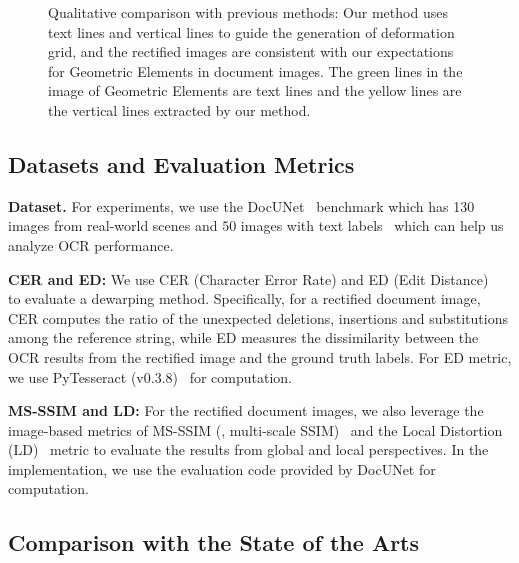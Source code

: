 \documentclass[10pt,twocolumn,letterpaper]{article}
\newcommand{\myparagraph}[1]{\vspace{1pt} \noindent \textbf{#1} }
\begin{document}
\begin{figure*}[!t]
\begin{subfigure}[b]{1.0\linewidth}
\end{subfigure}
\caption{Qualitative comparison with previous methods: Our method uses text lines and vertical lines to guide the generation of deformation grid, and the rectified images are consistent with our expectations for Geometric Elements in document images. The green lines in the image of Geometric Elements are text lines and the yellow lines are the vertical lines extracted by our method.}
\vspace{-3mm}
\label{fig:result}

\end{figure*}





\subsection{Datasets and Evaluation Metrics}


\myparagraph{Dataset.} For experiments, we use the DocUNet~\cite{Ma_2018_CVPR} benchmark which has 130 images from real-world scenes and $50$ images with text labels~\cite{textlabels} which can help us analyze OCR performance.

\myparagraph{CER and ED:} We use CER (Character Error Rate) and ED (Edit Distance)~\cite{levenshtein1966binary} to evaluate a dewarping method. Specifically, for a rectified document image, CER computes the ratio of the unexpected deletions, insertions and substitutions among the reference string, while ED measures the dissimilarity between the OCR results from the rectified image and the ground truth labels.  For ED metric, we use PyTesseract (v0.3.8)~\cite{smith2007overview} for computation.


\myparagraph{MS-SSIM and LD:} 
For the rectified document images, we also leverage the image-based metrics of MS-SSIM (\ie, multi-scale SSIM)~\cite{wang2004image} and the Local Distortion (LD)~\cite{liu2010sift} metric to evaluate the results from global and local perspectives. In the implementation, we use the evaluation code provided by DocUNet for computation.


\subsection{Comparison with the State of the Arts}
\end{document}

